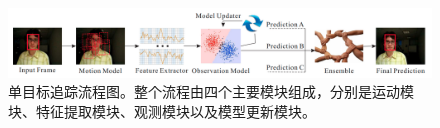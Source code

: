 \begin{figure}[t]
	\centering
	\includegraphics[width=\textwidth]{./imgs/sot_pipeline.png}
	\caption{单目标追踪流程图\cite{Wang2015Understanding}。整个流程由四个主要模块组成，分别是运动模块、特征提取模块、观测模块以及模型更新模块。}
	\label{fig:sot_pipeline}
\end{figure}
